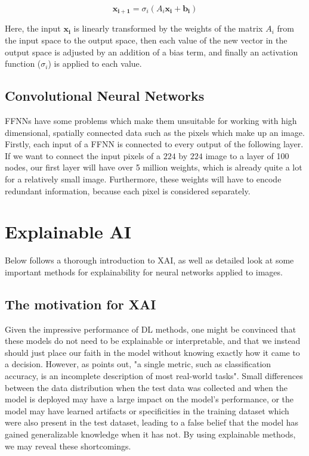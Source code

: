 \documentclass[UKenglish]{uiomasterthesis} %
\theoremstyle{definition}
\begin{document}
\begin{equation}
\bm{x_{i+1}} = \sigma_i (A_i \bm{x_i} + \bm{b_i})
\label{ffnn}
\end{equation}

Here, the input $\bm{x_i}$ is linearly transformed by the weights of the matrix $A_i$ from the input space to the output space, then each value of the new vector in the output space is adjusted by an addition of a bias term, and finally an activation function ($\sigma_i$) is applied to each value. 


\subsection{Convolutional Neural Networks}

FFNNs have some problems which make them unsuitable for working with high dimensional, spatially connected data such as the pixels which make up an image. Firstly, each input of a FFNN is connected to every output of the following layer. If we want to connect the input pixels of a $224$ by $224$ image to a layer of 100 nodes, our first layer will have over 5 million weights, which is already quite a lot for a relatively small image. Furthermore, these weights will have to encode redundant information, because each pixel is considered separately.

\section{Explainable AI} \label{xai_intro}

Below follows a thorough introduction to XAI, as well as detailed look at some important methods for explainability for neural networks applied to images.

\subsection{The motivation for XAI}

Given the impressive performance of DL methods, one might be convinced that these models do not need to be explainable or interpretable, and that we instead should just place our faith in the model without knowing exactly how it came to a decision. However, as \cite{doshivelez} points out, "a single metric, such as classification accuracy, is an incomplete description of most real-world tasks". Small differences between the data distribution when the test data was collected and when the model is deployed may have a large impact on the model's performance, or the model may have learned artifacts or specificities in the training dataset which were also present in the test dataset, leading to a false belief that the model has gained generalizable knowledge when it has not. By using explainable methods, we may reveal these shortcomings.
\end{document}
